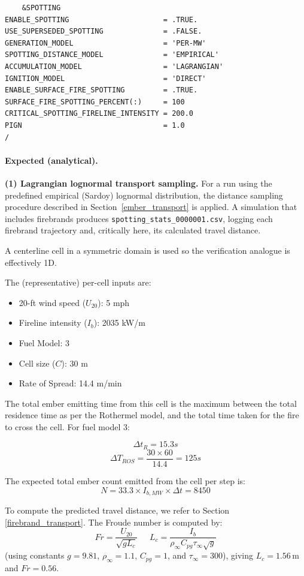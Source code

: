 \begin{verbatim}
    &SPOTTING
ENABLE_SPOTTING                      = .TRUE.
USE_SUPERSEDED_SPOTTING				 = .FALSE.
GENERATION_MODEL					 = 'PER-MW'
SPOTTING_DISTANCE_MODEL				 = 'EMPIRICAL'
ACCUMULATION_MODEL					 = 'LAGRANGIAN'
IGNITION_MODEL						 = 'DIRECT'
ENABLE_SURFACE_FIRE_SPOTTING         = .TRUE.
SURFACE_FIRE_SPOTTING_PERCENT(:)     = 100
CRITICAL_SPOTTING_FIRELINE_INTENSITY = 200.0
PIGN                                 = 1.0
/
\end{verbatim}

\paragraph{Expected (analytical).} 
\textbf{(1) Lagrangian lognormal transport sampling.} For a run using the predefined empirical (Sardoy) lognormal distribution, the distance sampling procedure described in Section~\ref{ember_transport} is applied. A simulation that includes firebrands produces \texttt{spotting\_stats\_0000001.csv}, logging each firebrand trajectory and, critically here, its calculated travel distance. 

A centerline cell in a symmetric domain is used so the verification analogue is effectively 1D.

The (representative) per-cell inputs are:
\begin{itemize}
    \item 20-ft wind speed ($U_{20}$): 5 mph
    \item Fireline intensity ($I_b$): 2035 kW/m
    \item Fuel Model: 3
    \item Cell size ($C$): 30 m
    \item Rate of Spread: 14.4 m/min 
\end{itemize}

The total ember emitting time from this cell is the maximum between the total residence time as per the Rothermel model, and the total time taken for the fire to cross the cell. For fuel model 3:

\[
\Delta t_R = 15.3 s
\]
\[
\Delta T_{ROS}=\frac{30\times60}{14.4}=125s
\]

The expected total ember count emitted from the cell per step is:
\[
N=33.3\times I_{b,MW}\times \Delta t=8450
\]

To compute the predicted travel distance, we refer to Section \ref{firebrand_transport}. The Froude number is computed by:
\[
Fr = \frac{U_{20}}{\sqrt{gL_c}}\;\;\;\;\;L_c=\frac{I_b}{\rho_\infty C_{pg} \tau_\infty \sqrt{g}}
\]
(using constants $g=9.81$, $\rho_\infty = 1.1$, $C_{pg} = 1$, and $\tau_\infty = 300$), giving $L_c = 1.56\,\mathrm{m}$ and $Fr = 0.56$.

